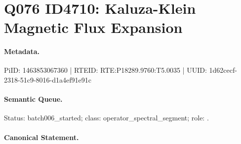 \section*{Q076 ID4710: Kaluza-Klein Magnetic Flux Expansion}
\paragraph{Metadata.}
PiID: 1463853067360 | RTEID: RTE:P18289.9760:T5.0035 | UUID: 1d62cecf-2318-51c9-8016-d1a4ef91e91c

\paragraph{Semantic Queue.}
Status: batch006\_started; class: operator\_spectral\_segment; role: .

\paragraph{Canonical Statement.}
